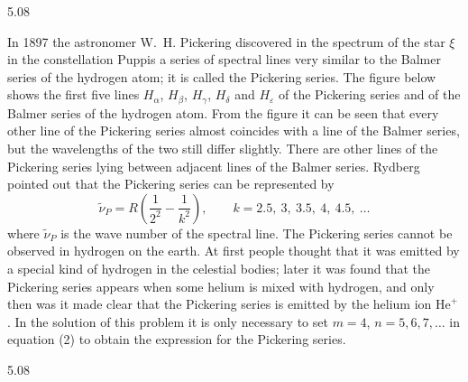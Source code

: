 \begin{solution}{5.08}
\begin{commentary}
In 1897 the astronomer W.~H. Pickering discovered in the spectrum of the star $\xi$ in the
constellation Puppis a series of spectral lines very similar to the Balmer series of the
hydrogen atom; it is called the Pickering series. The figure below shows the first five lines
$H_\alpha$, $H_\beta$, $H_\gamma$, $H_\delta$ and $H_\varepsilon$ of the Pickering series and
of the Balmer series of the hydrogen atom. From the figure it can be seen that every other
line of the Pickering series almost coincides with a line of the Balmer series, but the
wavelengths of the two still differ slightly. There are other lines of the Pickering series
lying between adjacent lines of the Balmer series. Rydberg pointed out that the Pickering
series can be represented by
\begin{equation*}
\tilde{\nu}_P = R\left(\frac{1}{2^2} - \frac{1}{k^2}\right),
\qquad k = 2.5,\ 3,\ 3.5,\ 4,\ 4.5,\ \ldots
\end{equation*}
where $\tilde{\nu}_P$ is the wave number of the spectral line. The Pickering series cannot be
observed in hydrogen on the earth. At first people thought that it was emitted by a special
kind of hydrogen in the celestial bodies; later it was found that the Pickering series
appears when some helium is mixed with hydrogen, and only then was it made clear that the
Pickering series is emitted by the helium ion $\mathrm{He}^+$. In the solution of this
problem it is only necessary to set $m = 4$, $n = 5, 6, 7, \ldots$ in equation (2) to obtain
the expression for the Pickering series.

\begin{figbox}{5.08}
\end{figbox}
\end{commentary}
\end{solution}

